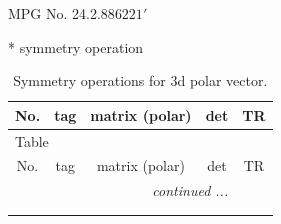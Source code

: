 \documentclass[fleqn,8pt]{jsarticle}
\begin{document}
\setcounter{MaxMatrixCols}{32}

\renewcommand{\tablename}{Table~}
\renewcommand{\figurename}{Figure~}
\begin{center}
\LARGE
MPG No. 24.2.88\quad$6221'$
\end{center}
* symmetry operation
\renewcommand{\arraystretch}{1.3}
\begin{longtable}{ccccc}
\caption{Symmetry operations for 3d polar vector.}
 \\
 \hline \hline
No. & tag & matrix (polar) & det & TR \\ \hline \endfirsthead

\multicolumn{4}{l}{\tablename\ \thetable{}} \\
 \hline \hline
No. & tag & matrix (polar) & det & TR \\ \hline \endhead

 \hline \hline
\multicolumn{4}{r}{\footnotesize\it continued ...} \\ \endfoot

 \hline \hline
\multicolumn{4}{r}{} \\ \endlastfoot


\end{longtable}
\end{document}
